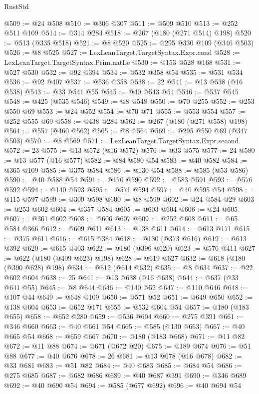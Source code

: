 \begin{lexlean}{RustStd}
\begin{coremodule}
@509 := @24 @508
@510 := @306 @307
@511 := @509 @510
@513 := @252 @511 @109
@514 := @314 @284
@518 := @267 (@180 (@271 @514) @198)
@520 := @513 (@335 @518)
@521 := @8 @520
@525 := @295 @330 @109 (@346 @503)
@526 := @8 @525
@527 := LexLeanTarget.TargetSyntax.Expr.cond
@528 := LexLeanTarget.TargetSyntax.Prim.natLe
@530 := @153 @528 @168
@531 := @527 @530
@532 := @92 @394
@534 := @532 @358 @54
@535 := @531 @534
@536 := @92 @407
@537 := @536 @358
@538 := 22
@541 := @13 @538 (@16 @538)
@543 := @33 @541 @55
@545 := @40 @543 @54
@546 := @537 @545
@548 := @425 (@535 @546)
@549 := @8 @548
@550 := @70 @255
@552 := @253 @550 @69
@553 := @24 @552
@554 := @70 @71
@555 := @553 @554
@557 := @252 @555 @69
@558 := @438 @284
@562 := @267 (@180 (@271 @558) @198)
@564 := @557 (@460 @562)
@565 := @8 @564
@569 := @295 @550 @69 (@347 @503)
@570 := @8 @569
@571 := LexLeanTarget.TargetSyntax.Expr.second
@572 := 23
@575 := @13 @572 (@16 @572)
@576 := @33 @575
@577 := 24
@580 := @13 @577 (@16 @577)
@582 := @84 @580 @54
@583 := @40 @582
@584 := @365 @109
@585 := @375 @584
@586 := @130 @54
@588 := @585 (@53 @586)
@590 := @40 @588 @54
@591 := @170 @590
@592 := @583 @591
@593 := @576 @592
@594 := @140 @593
@595 := @571 @594
@597 := @40 @595 @54
@598 := @115 @597
@599 := @309 @598
@600 := @8 @599
@602 := @24 @584 @29
@603 := @253 @602
@604 := @357 @584
@605 := @603 @604
@606 := @24 @605
@607 := @361 @602
@608 := @606 @607
@609 := @252 @608
@611 := @65 @584 @366
@612 := @609 @611
@613 := @138 @611
@614 := @613 @171
@615 := @375 @611
@616 := @615 @384
@618 := @180 (@373 @616)
@619 := @613 @392
@620 := @615 @403
@622 := @180 (@396 @620)
@623 := @576 @411
@627 := @622 (@180 (@409 @623) @198)
@628 := @619 @627
@632 := @618 (@180 (@390 @628) @198)
@634 := @612 (@614 @632)
@635 := @8 @634
@637 := @22 @602 @604
@638 := 25
@641 := @13 @638 (@16 @638)
@644 := @637 (@33 @641 @55)
@645 := @8 @644
@646 := @140 @52
@647 := @110 @646
@648 := @107 @44
@649 := @648 @109
@650 := @571 @52
@651 := @649 @650
@652 := @138 @604
@653 := @652 @171
@655 := @532 @604 @54
@657 := @180 (@183 @655)
@658 := @652 @280
@659 := @536 @604
@660 := @275 @391
@661 := @346 @660
@663 := @40 @661 @54
@665 := @585 (@130 @663)
@667 := @40 @665 @54
@668 := @659 @667
@670 := @180 (@183 @668)
@671 := @11 @82
@672 := @11 @88
@674 := @671 (@672 @20)
@675 := @189 @674
@676 := @51 @88
@677 := @40 @676
@678 := 26
@681 := @13 @678 (@16 @678)
@682 := @33 @681
@683 := @51 @82
@684 := @40 @683
@685 := @684 @54
@686 := @275 @685
@687 := @682 @686
@689 := @40 @687 @391
@690 := @346 @689
@692 := @40 @690 @54
@694 := @585 (@677 @692)
@696 := @40 @694 @54

\end{coremodule}
\end{lexlean}
